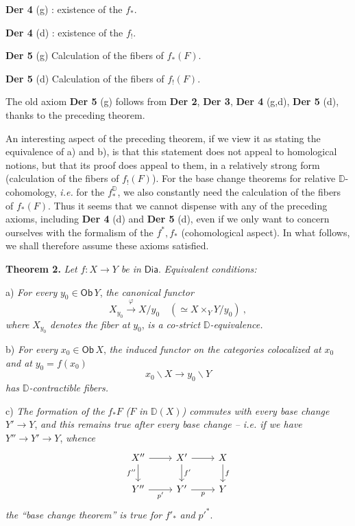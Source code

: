 \documentclass[11pt]{article}
\newcommand{\printedpage}[1]{\marginpar{\footnotesize p.~#1}}
\newcommand{\msp}[1]{\marginpar{\footnotesize [#1]}}
\newcommand{\D}{\mathbb{D}}
\newcommand{\Dia}{\mathsf{Dia}}
\newcommand{\Ob}{\mathsf{Ob}}
\begin{document}
\printedpage{40}
\msp{page 68}

\noindent\textbf{Der 4} (g) : existence of the $f_*$.

\noindent\textbf{Der 4} (d) : existence of the $f_!$.

\noindent\textbf{Der 5} (g) Calculation of the fibers of $f_*(F)$.

\noindent\textbf{Der 5} (d) Calculation of the fibers of $f_!(F)$.

\noindent The old axiom \textbf{Der 5} (g) follows from \textbf{Der 2}, \textbf{Der 3}, \textbf{Der 4} (g,d), \textbf{Der 5} (d), thanks to the preceding theorem.

An interesting aspect of the preceding theorem, if we view it as stating the equivalence of a) and b), is that this statement does not appeal to homological notions, but that its proof does appeal to them, in a relatively strong form (calculation of the fibers of $f_!(F)$). For the base change theorems for relative $\D$-cohomology, \textit{i.e.} for the $f_*^{\D}$, we also constantly need the calculation of the fibers of $f_*(F)$. Thus it seems that we cannot dispense with any of the preceding axioms, including \textbf{Der 4} (d) and \textbf{Der 5} (d), even if we only want to concern ourselves with the formalism of the $f^*, f_*$ (cohomological aspect). In what follows, we shall therefore assume these axioms satisfied.

\noindent\textbf{Theorem 2.} \textit{Let} $f : X \to Y$ \textit{be in} $\Dia$. \textit{Equivalent conditions:}

a) \textit{For every} $y_0 \in \Ob\, Y$, \textit{the canonical functor}
\[
X_{y_0} \overset{\varphi}{\longrightarrow} X/y_0 \quad (\simeq X \times_Y Y/y_0) \ ,
\]
\textit{where} $X_{y_0}$ \textit{denotes the fiber at} $y_0$, \textit{is a co-strict} $\D$\textit{-equivalence.}

b) \textit{For every} $x_0 \in \Ob\, X$, \textit{the induced functor on the categories colocalized at} $x_0$ \textit{and at} $y_0 = f(x_0)$
\[
x_0\backslash X \longrightarrow y_0\backslash Y
\]
\textit{has} $\D$\textit{-contractible fibers.}

\msp{page 69}

c) \textit{The formation of the} $f_*F$ \textit{(}$F$ \textit{in} $\D(X)$\textit{) commutes with every base change} $Y' \to Y$, \textit{and this remains true after every base change -- i.e. if we have} $Y'' \to Y' \to Y$, \textit{whence}
\[
\begin{tikzcd}
X'' \arrow[r] \arrow[d, "f''"{swap}] & X' \arrow[r] \arrow[d, "f'"] & X \arrow[d, "f"] \\
Y'' \arrow[r, "p'"{swap}] & Y' \arrow[r, "p"{swap}] & Y
\end{tikzcd}
\]
\textit{the ``base change theorem'' is true for} $f'_*$ \textit{and} $p'^{*}$.
\end{document}
